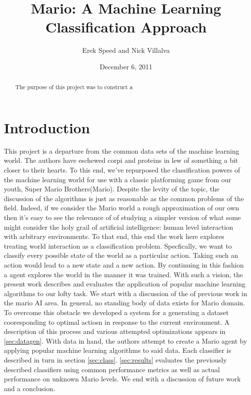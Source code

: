 \documentclass[]{article}   %
\begin{document}
\title{Mario: A Machine Learning Classification Approach}   %
\author{Erek Speed and Nick Villalva}         %
\date{December 6, 2011}    %
\maketitle

\begin{abstract}
 The purpose of this project was to construct a 
\end{abstract}


\section{Introduction}     %
This project is a departure from the common data sets of the machine learning world. The authors have eschewed corpi and proteins in lew of something a bit closer to their hearts.  To this end, we've repurposed the classification powers of the machine learning world for use with a classic platforming game from our youth, Super Mario Brothers(Mario).  Despite the levity of the topic, the discussion of the algorithms is just as reasonable as the common problems of the field.  Indeed, if we consider the Mario world a rough approximation of our own then it's easy to see the relevance of of studying a simpler version of what some might consider the holy grail of artificial intelligence: human level interaction with arbitrary environments.
\newline\newline
To that end, this end the work here explores treating world interaction as a classification problem.  Specfically, we want to classify every possible state of the world as a particular action. Taking such an action would lead to a new state and a new action.  By continuing in this fashion a agent explores the world in the manner it was trained.
\newline\newline
With such a vision, the present work describes and evaluates the application of popular machine learning algorithms to our lofty task.  We start with a discussion of the of previous work in the mario AI area.  In general, no standing body of data exists for Mario domain.  To overcome this obstacle we developed a system for a generating a dataset cooresponding to optimal actiosn in response to the current environment.  A description of this process and various attempted optimizations appears in \ref{sec:datagen}.  With data in hand, the authors attempt to create a Mario agent by applying popular machine learning algorithms to said data.  Each classifier is described in turn in section \ref{sec:class}.  \ref{sec:results} evaluates the previously described classifiers using common performance metrics as well as actual performance on unknown Mario levels.  We end with a discussion of future work and a conclusion.
\end{document}
